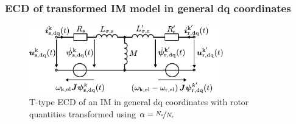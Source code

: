 \begin{frame}
	\frametitle{ECD of transformed IM model in general dq coordinates}
    \begin{figure}
        \centering
        \includegraphics[width=0.75\textwidth]{fig/lec06/IM_T_ECD_dq.pdf}
        \caption{T-type ECD of an IM in general dq coordinates with rotor quantities transformed using $\alpha = \nicefrac{N_\mathrm{s}}{N_\mathrm{r}}$}
        \label{fig:IM_T_ECD_dq}
    \end{figure}
\end{frame}

